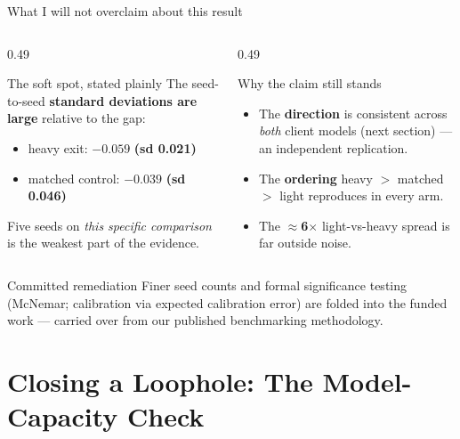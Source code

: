 \documentclass[aspectratio=169, 11pt]{beamer}
\begin{document}
\begin{frame}{What I will not overclaim about this result}
\begin{columns}[T]
\begin{column}{0.49\textwidth}
\begin{alertblock}{The soft spot, stated plainly}
The seed-to-seed \textbf{standard deviations are large} relative to the gap:
\begin{itemize}\small
\item heavy exit: $-0.059$ \textbf{(sd 0.021)}
\item matched control: $-0.039$ \textbf{(sd 0.046)}
\end{itemize}
Five seeds on \emph{this specific comparison} is the weakest part of the
evidence.
\end{alertblock}
\end{column}
\begin{column}{0.49\textwidth}
\begin{exampleblock}{Why the claim still stands}
\begin{itemize}\small
\item The \textbf{direction} is consistent across \emph{both} client models
      (next section) --- an independent replication.
\item The \textbf{ordering} heavy $>$ matched $>$ light reproduces in every
      arm.
\item The \textbf{$\approx$6$\times$} light-vs-heavy spread is far outside
      noise.
\end{itemize}
\end{exampleblock}
\end{column}
\end{columns}
\vspace{0.5em}
\begin{block}{Committed remediation}
Finer seed counts and formal significance testing (McNemar; calibration via
expected calibration error) are folded into the funded work --- carried over
from our published benchmarking methodology.
\end{block}
\end{frame}

\section{Closing a Loophole: The Model-Capacity Check}
\end{document}
